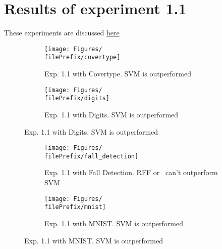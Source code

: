 
\newcommand{\major}{1}
\newcommand{\minor}{1}

\newcommand{\undPrefix}{\major_\minor}
\newcommand{\dotPrefix}{\major.\minor}
\newcommand{\scoPrefix}{\major-\minor}
\newcommand{\filePrefix}{\undPrefix}

\chapter{Results of experiment \dotPrefix} %


\label{Appendix\scoPrefix} %

These experiments are discussed \hyperref[disc:h1]{here}


\begin{figure}[ht]
  \centering
  \begin{subfigure}[t]{0.5\linewidth}
    \centering\captionsetup{width=.8\linewidth}\texttt{[image: Figures/\\filePrefix/covertype]}
    \caption{Exp. 1.1 with Covertype. SVM is outperformed}
    \label{fig:\undPrefix_covertype}
  \end{subfigure}%
  \begin{subfigure}[t]{0.5\linewidth}
    \centering\captionsetup{width=.8\linewidth}\texttt{[image: Figures/\\filePrefix/digits]}
    \caption{Exp. 1.1 with Digits. SVM is outperformed}
    \label{fig:\undPrefix_digits}
  \end{subfigure}
\end{figure}


\begin{figure}[ht]
  \centering
  \begin{subfigure}[t]{0.5\linewidth}
    \centering\captionsetup{width=.8\linewidth}\texttt{[image: Figures/\\filePrefix/fall\_detection]}
    \caption{Exp. 1.1 with Fall Detection. RFF or \Nys\ can't outperform SVM}
    \label{fig:\undPrefix_fall_detection}
  \end{subfigure}%
  \begin{subfigure}[t]{0.5\linewidth}
    \centering\captionsetup{width=.8\linewidth}\texttt{[image: Figures/\\filePrefix/mnist]}
    \caption{Exp. 1.1 with MNIST. SVM is outperformed}
    \label{fig:\undPrefix_mnist}
  \end{subfigure}
\end{figure}


